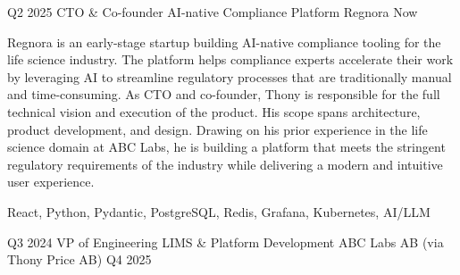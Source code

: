 %
%
%
\begin{experiences}

    \experience
    {Q2 2025}
    {CTO \& Co-founder}
    {AI-native Compliance Platform}
    {Regnora}
    {Now} {

        Regnora is an early-stage startup building AI-native compliance tooling for the life science industry.
        The platform helps compliance experts accelerate their work by leveraging AI to streamline regulatory processes that are traditionally manual and time-consuming.
        \newline \newline
        As CTO and co-founder, Thony is responsible for the full technical vision and execution of the product.
        His scope spans architecture, product development, and design.
        Drawing on his prior experience in the life science domain at ABC Labs, he is building a platform that meets the stringent regulatory requirements of the industry while delivering a modern and intuitive user experience.
        \newline
    }
    {React, Python, Pydantic, PostgreSQL, Redis, Grafana, Kubernetes, AI/LLM}
    \emptySeparator

    \experience
    {Q3 2024}
    {VP of Engineering}
    {LIMS \& Platform Development}
    {ABC Labs AB (via Thony Price AB)}
    {Q4 2025} {

}
\end{experiences}
